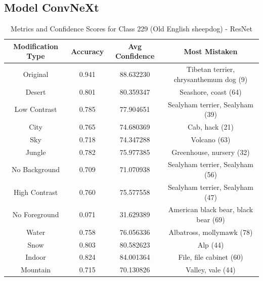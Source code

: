 \subsection*{Model ConvNeXt}



\begin{table}
	\centering
	\begin{tabular}{|c|c|c|c|}
		\hline
		\textbf{Modification Type} & \textbf{Accuracy} & \textbf{Avg Confidence} & \textbf{Most Mistaken} \\
		\hline
		Original & 0.941 & 88.632230 & Tibetan terrier, chrysanthemum dog (9) \\
		\hline
		Desert & 0.801 & 80.359347 & Seashore, coast (64) \\
		\hline
		Low Contrast & 0.785 & 77.904651 & Sealyham terrier, Sealyham (39) \\
		\hline
		City & 0.765 & 74.680369 & Cab, hack (21) \\
		\hline
		Sky & 0.718 & 74.347288 & Volcano (63) \\
		\hline
		Jungle & 0.782 & 75.977385 & Greenhouse, nursery (32) \\
		\hline
		No Background & 0.709 & 71.070938 & Sealyham terrier, Sealyham (56) \\
		\hline
		High Contrast & 0.760 & 75.577558 & Sealyham terrier, Sealyham (47) \\
		\hline
		No Foreground & 0.071 & 31.629389 & American black bear, black bear (69) \\
		\hline
		Water & 0.758 & 76.056336 & Albatross, mollymawk (78) \\
		\hline
		Snow & 0.803 & 80.582623 & Alp (44) \\
		\hline
		Indoor & 0.824 & 84.001364 & File, file cabinet (60) \\
		\hline
		Mountain & 0.715 & 70.130826 & Valley, vale (44) \\
		\hline
	\end{tabular}
	\caption{Metrics and Confidence Scores for Class 229 (Old English sheepdog) - ResNet}
	\label{tab:metrics_confidence_class_229_resnet}
\end{table}


